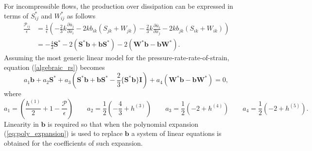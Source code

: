 \documentclass[oneside,a4paper,11pt]{report}
\newcommand{\uavg}{\overline{u}}
\newcommand{\Stau}{S^*}
\newcommand{\Wtau}{W^*}
\begin{document}
For incompressible flows, the production over dissipation can be expressed in terms of $\Stau_{ij}$ and $\Wtau_{ij}$ as follows
\begin{align}
\frac{\mathcal{P}_{ij}}{\epsilon} &= \frac{1}{\epsilon} \left (-\frac{2}{3} k \frac{\partial \uavg_j}{\partial x_i} - 2kb_{ik}(S_{jk} + W_{jk}) - \frac{2}{3} k \frac{\partial \uavg_i}{\partial x_j} - 2kb_{jk}(S_{ik} + W_{ik}) \right ) \nonumber \\
& = -\frac{4}{3} \mathbf{\Stau} - 2( \mathbf{\Stau} \mathbf{b} + \mathbf{b} \mathbf{\Stau}) - 2 (\mathbf{\Wtau} \mathbf{b} - \mathbf{b} \mathbf{\Wtau} ).
\end{align}
Assuming the most generic linear model for the pressure-rate-rate-of-strain, equation (\ref{algebraic_rs}) becomes
\begin{equation}
a_1 \mathbf{b} + a_2 \mathbf{\Stau} + a_3 \left (\mathbf{\Stau} \mathbf{b} + \mathbf{b} \mathbf{\Stau} - \frac{2}{3} \{ \mathbf{\Stau} \mathbf{b} \} \mathbf{I} \right) + a_4 (\mathbf{\Wtau} \mathbf{b} - \mathbf{b} \mathbf{\Wtau}) = 0,
\end{equation}
where
\begin{equation}
a_1 = \left ( \frac{h^{(1)}}{2} +1 - \frac{\mathcal{P}}{\epsilon} \right ) \qquad a_2 = \frac{1}{2} \left (-\frac{4}{3} + h^{(3)} \right ) \qquad a_3 = \frac{1}{2} \left (-2 + h^{(4)} \right ) \qquad a_4 = \frac{1}{2} \left (-2 + h^{(5)} \right ).
\end{equation}
Linearity in $\mathbf{b}$ is required so that when the polynomial expansion (\ref{eq:poly_expansion}) is used to replace $\mathbf{b}$ a system of linear equations is obtained for the coefficients of such expansion.
\end{document}
